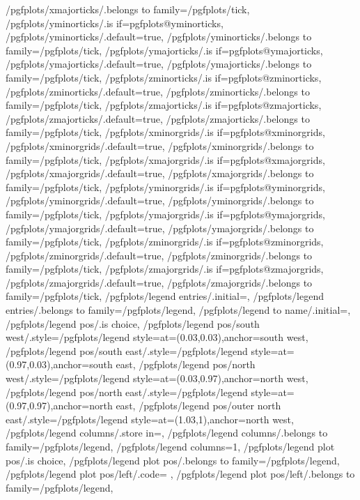 {	/pgfplots/xmajorticks/.belongs to family=/pgfplots/tick,
	/pgfplots/yminorticks/.is if=pgfplots@yminorticks,
	/pgfplots/yminorticks/.default=true,
	/pgfplots/yminorticks/.belongs to family=/pgfplots/tick,
	/pgfplots/ymajorticks/.is if=pgfplots@ymajorticks,
	/pgfplots/ymajorticks/.default=true,
	/pgfplots/ymajorticks/.belongs to family=/pgfplots/tick,
	/pgfplots/zminorticks/.is if=pgfplots@zminorticks,
	/pgfplots/zminorticks/.default=true,
	/pgfplots/zminorticks/.belongs to family=/pgfplots/tick,
	/pgfplots/zmajorticks/.is if=pgfplots@zmajorticks,
	/pgfplots/zmajorticks/.default=true,
	/pgfplots/zmajorticks/.belongs to family=/pgfplots/tick,
	/pgfplots/xminorgrids/.is if=pgfplots@xminorgrids,
	/pgfplots/xminorgrids/.default=true,
	/pgfplots/xminorgrids/.belongs to family=/pgfplots/tick,
	/pgfplots/xmajorgrids/.is if=pgfplots@xmajorgrids,
	/pgfplots/xmajorgrids/.default=true,
	/pgfplots/xmajorgrids/.belongs to family=/pgfplots/tick,
	/pgfplots/yminorgrids/.is if=pgfplots@yminorgrids,
	/pgfplots/yminorgrids/.default=true,
	/pgfplots/yminorgrids/.belongs to family=/pgfplots/tick,
	/pgfplots/ymajorgrids/.is if=pgfplots@ymajorgrids,
	/pgfplots/ymajorgrids/.default=true,
	/pgfplots/ymajorgrids/.belongs to family=/pgfplots/tick,
	/pgfplots/zminorgrids/.is if=pgfplots@zminorgrids,
	/pgfplots/zminorgrids/.default=true,
	/pgfplots/zminorgrids/.belongs to family=/pgfplots/tick,
	/pgfplots/zmajorgrids/.is if=pgfplots@zmajorgrids,
	/pgfplots/zmajorgrids/.default=true,
	/pgfplots/zmajorgrids/.belongs to family=/pgfplots/tick,
	/pgfplots/legend entries/.initial={},
	/pgfplots/legend entries/.belongs to family=/pgfplots/legend,
	/pgfplots/legend to name/.initial=,%
	/pgfplots/legend pos/.is choice,
	/pgfplots/legend pos/south west/.style={/pgfplots/legend style={at={(0.03,0.03)},anchor=south west}},
	/pgfplots/legend pos/south east/.style={/pgfplots/legend style={at={(0.97,0.03)},anchor=south east}},
	/pgfplots/legend pos/north west/.style={/pgfplots/legend style={at={(0.03,0.97)},anchor=north west}},
	/pgfplots/legend pos/north east/.style={/pgfplots/legend style={at={(0.97,0.97)},anchor=north east}},
	/pgfplots/legend pos/outer north east/.style={/pgfplots/legend style={at={(1.03,1)},anchor=north west}},
	/pgfplots/legend columns/.store in=\pgfplots@legend@columns,
	/pgfplots/legend columns/.belongs to family=/pgfplots/legend,
	/pgfplots/legend columns=1,
	/pgfplots/legend plot pos/.is choice,
	/pgfplots/legend plot pos/.belongs to family=/pgfplots/legend,
	/pgfplots/legend plot pos/left/.code=	{\def\pgfplots@legend@plot@pos{0}},
	/pgfplots/legend plot pos/left/.belongs to family=/pgfplots/legend,
}
